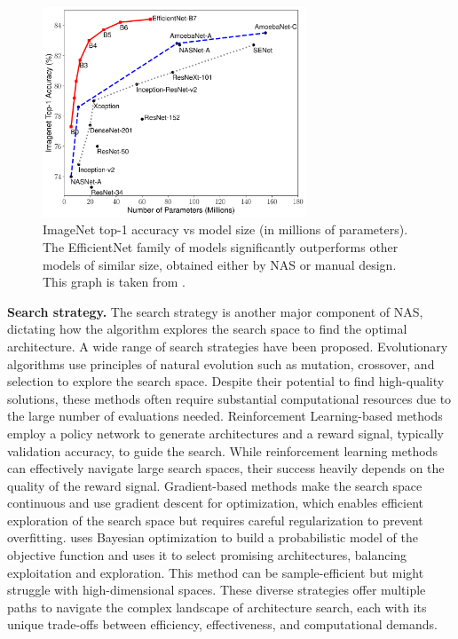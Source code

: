 \begin{figure}[htbp]
  \centering
  \includegraphics[width=0.70\textwidth]{chapter_sota/assets/efficientnet_perfs_overview.pdf}
  \caption{ImageNet top-1 accuracy vs model size (in millions of parameters).
    The EfficientNet family of models significantly outperforms other models of
    similar size, obtained either by \ac{NAS} or manual design. This graph is
    taken from \cite{DBLP:conf/icml/TanL19}.
  }
  \label{fig:sota:efficientnet_perfs}
\end{figure}


\noindent\textbf{Search strategy.} The search strategy is another major component of \ac{NAS}, dictating how the
algorithm explores the search space to find the optimal architecture. A wide
range of search strategies have been proposed. Evolutionary algorithms
\cite{DBLP:conf/icml/RealMSSSTLK17} use principles of natural evolution such as
mutation, crossover, and selection to explore the search space. Despite their
potential to find high-quality solutions, these methods often require
substantial computational resources due to the large number of evaluations
needed. Reinforcement Learning-based methods \cite{DBLP:conf/iclr/ZophL17}
employ a policy network to generate architectures and a reward signal, typically
validation accuracy, to guide the search. While reinforcement learning methods
can effectively navigate large search spaces, their success heavily depends on
the quality of the reward signal. Gradient-based methods
\cite{DBLP:conf/iclr/LiuSY19,DBLP:conf/iclr/XuX0CQ0X20} make the search space
continuous and use gradient descent for optimization, which enables efficient
exploration of the search space but requires careful regularization to prevent
overfitting. \cite{DBLP:conf/nips/BergstraBBK11} uses Bayesian optimization to
build a probabilistic model of the objective function and uses it to select
promising architectures, balancing exploitation and exploration. This method can
be sample-efficient but might struggle with high-dimensional spaces. These
diverse strategies offer multiple paths to navigate the complex landscape of
architecture search, each with its unique trade-offs between efficiency,
effectiveness, and computational demands.\\


